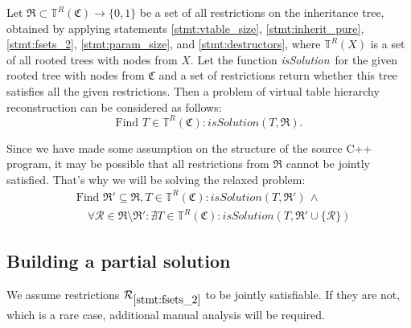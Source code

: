 \documentclass[times, 10pt,twocolumn]{article}
\newcommand{\gC}{\mathfrak{C}}
\newcommand{\gR}{\mathfrak{R}}
\newcommand{\cR}{\mathcal{R}}
\newcommand{\nT}{\mathbb{T}}
\newcommand{\isSol}{\textit{isSolution}}
\begin{document}
Let $\gR \subset \nT^R(\gC) \rightarrow \{0, 1\}$ be a set
of all restrictions on the inheritance tree,
obtained by applying statements \ref{stmt:vtable_size},
\ref{stmt:inherit_pure}, \ref{stmt:fsets_2},
\ref{stmt:param_size}, and \ref{stmt:destructors},
where $\nT^R(X)$ is a set of all rooted trees with nodes from $X$.
Let the function \isSol~for the given rooted tree with nodes from $\gC$ and
a set of restrictions return whether this tree satisfies all
the given restrictions. 
Then a problem of virtual table hierarchy reconstruction can be considered
as follows:
\begin{equation}\label{eq:problem}
\text{Find~} T \in \nT^R(\gC): \isSol(T, \gR) \text{.}
\end{equation}

Since we have made some assumption on the structure of the source C++ program,
it may be possible that all restrictions from $\gR$ cannot
be jointly satisfied.
That's why we will be solving the relaxed problem:
\begin{equation}\label{eq:relaxed_problem}
\begin{aligned}
& \text{Find~} \gR' \subseteq \gR, T \in \nT^R(\gC): \isSol(T, \gR') \, \wedge \\
& \quad \forall \cR \in \gR \setminus \gR': \nexists T \in \nT^R(\gC): \isSol(T, \gR' \cup \{\cR\})
\end{aligned}
\end{equation}

\subsection{Building a partial solution}

We assume restrictions $\cR_{\ref{stmt:fsets_2}}$ to be jointly satisfiable.
If they are not, which is a rare case,
additional manual analysis will be required.
\end{document}
